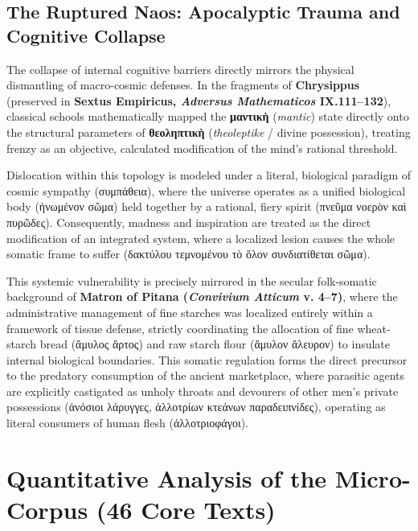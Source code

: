 \documentclass[11pt,twoside,a4paper]{article}
\begin{document}
\subsection{The Ruptured Naos: Apocalyptic Trauma and Cognitive Collapse}
The collapse of internal cognitive barriers directly mirrors the physical dismantling of macro-cosmic defenses. In the fragments of \textbf{Chrysippus} (preserved in \textbf{Sextus Empiricus, \textit{Adversus Mathematicos} IX.111--132}), classical schools mathematically mapped the \textgreek{\textbf{μαντικὴ}} (\textit{mantic}) state directly onto the structural parameters of \textgreek{\textbf{θεοληπτικὴ}} (\textit{theoleptike} / divine possession), treating frenzy as an objective, calculated modification of the mind's rational threshold. 

Dislocation within this topology is modeled under a literal, biological paradigm of cosmic sympathy (\textgreek{συμπάθεια}), where the universe operates as a unified biological body (\textgreek{ἡνωμένον σῶμα}) held together by a rational, fiery spirit (\textgreek{πνεῦμα νοερὸν καὶ πυρῶδες}). Consequently, madness and inspiration are treated as the direct modification of an integrated system, where a localized lesion causes the whole somatic frame to suffer (\textgreek{δακτύλου τεμνομένου τὸ ὅλον συνδιατίθεται σῶμα}).

This systemic vulnerability is precisely mirrored in the secular folk-somatic background of \textbf{Matron of Pitana (\textit{Convivium Atticum} v. 4--7)}, where the administrative management of fine starches was localized entirely within a framework of tissue defense, strictly coordinating the allocation of fine wheat-starch bread (\textgreek{ἄμυλος ἄρτος}) and raw starch flour (\textgreek{ἄμυλον ἄλευρον}) to insulate internal biological boundaries. This somatic regulation forms the direct precursor to the predatory consumption of the ancient marketplace, where parasitic agents are explicitly castigated as unholy throats and devourers of other men's private possessions (\textgreek{ἀνόσιοι λάρυγγες, ἀλλοτρίων κτεάνων παραδειπνίδες}), operating as literal consumers of human flesh (\textgreek{ἀλλοτριοφάγοι}).


\section{Quantitative Analysis of the Micro-Corpus (46 Core Texts)}
\end{document}
